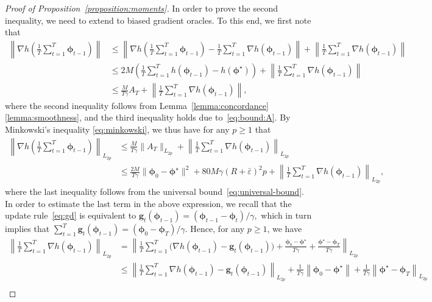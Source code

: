 \documentclass[11pt, a4paper, oneside, reqno]{article}
\begin{document}
\begin{proof}[Proof of Proposition~\ref{proposition:moments}]
		In order to prove the second inequality, we need to extend \citep[Proposition~7]{bach2013adaptivity} to biased gradient oracles. To this end, we first note that
		\begin{align*}
		\left\| \nabla h \left(\frac{1}{T} \sum_{t=1}^{T} \bm \phi_{t-1} \right) \right\|
		&\leq \left\| \nabla h \left(\frac{1}{T} \sum_{t=1}^{T} \bm \phi_{t-1} \right) - \frac{1}{T} \sum_{t=1}^T \nabla h(\bm \phi_{t-1}) \right\| 
		+ \left\| \frac{1}{T} \sum_{t=1}^T \nabla h(\bm \phi_{t-1}) \right\| \\
		&\leq  2 M \left( \frac{1}{T} \sum_{t=1}^T h(\bm \phi_{t-1}) - h(\bm \phi^\star) \right) + \left\| \frac{1}{T} \sum_{t=1}^T \nabla h(\bm \phi_{t-1}) \right\| \\
		&\leq \frac{M}{T \gamma} A_T + \left\| \frac{1}{T} \sum_{t=1}^T \nabla h(\bm \phi_{t-1}) \right\|,
		\end{align*}
		where the second inequality follows from Lemma~\ref{lemma:concordance}\,\ref{lemma:smoothness}, and the third inequality holds due to~\eqref{eq:bound:A}. By Minkowski's inequality \eqref{eq:minkowski}, we thus have for any $p \geq 1$ that
		\begin{align*}
		\left\| \nabla h \left(\frac{1}{T} \sum_{t=1}^{T} \bm \phi_{t-1} \right) \right\|_{L_{2p}}
		&\leq \frac{M}{T \gamma} \| A_T \|_{L_{2p}} + \left\| \frac{1}{T} \sum_{t=1}^T \nabla h(\bm \phi_{t-1}) \right\|_{L_{2p}} \\
		&\leq \frac{2 M}{T \gamma} \| \bm \phi_0 - \bm \phi^\star \|^2 + 80 M \gamma \left( R + \bar \varepsilon \right)^2 p + \left\| \frac{1}{T} \sum_{t=1}^T \nabla h(\bm \phi_{t-1}) \right\|_{L_{2p}},
		\end{align*}
		where the last inequality follows from the universal bound~\eqref{eq:universal-bound}. In order to estimate the last term in the above expression, we recall that the update rule~\eqref{eq:gd} is equivalent to $\bm g_t(\bm \phi_{t-1}) = \left( \bm \phi_{t-1} - \bm \phi_{t} \right) / \gamma ,$ which in turn implies that $\sum_{t=1}^T \bm g_t(\bm \phi_{t-1}) = \left( \bm \phi_0 - \bm \phi_T \right) / \gamma.$ Hence, for any $p \geq 1$, we have
		\begin{align*}
		\left\| \frac{1}{T} \sum_{t=1}^T \nabla h(\bm \phi_{t-1}) \right\|_{L_{2p}}
		&= \left\| \frac{1}{T} \sum_{t=1}^T \Big( \nabla h(\bm \phi_{t-1}) - \bm g_t(\bm \phi_{t-1}) \Big) + \frac{\bm \phi_0 - \bm \phi^\star}{T \gamma} + \frac{\bm \phi^\star - \bm \phi_T}{T \gamma} \right\|_{L_{2p}} \\
		&\leq \left\| \frac{1}{T} \sum_{t=1}^T \nabla h(\bm \phi_{t-1}) - \bm g_t(\bm \phi_{t-1}) \right\|_{L_{2p}} + \frac{1}{T \gamma} \left\| \bm \phi_0 - \bm \phi^\star \right\| + \frac{1}{T \gamma} \left\| \bm \phi^\star - \bm \phi_T \right\|_{L_{2p}} \\

\end{align*}
\end{proof}
\end{document}
